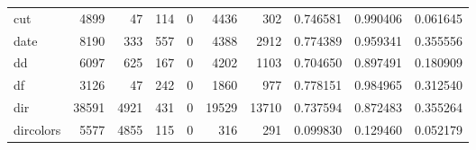 \begin{tabular}{lrrrrrrrrr}
cut       &                                               4899 &                                                 47 &                                                114 &                                                  0 &                                               4436 &                                                302 &                                           0.746581 &                               0.990406 &                             0.061645 \\
date      &                                               8190 &                                                333 &                                                557 &                                                  0 &                                               4388 &                                               2912 &                                           0.774389 &                               0.959341 &                             0.355556 \\
dd        &                                               6097 &                                                625 &                                                167 &                                                  0 &                                               4202 &                                               1103 &                                           0.704650 &                               0.897491 &                             0.180909 \\
df        &                                               3126 &                                                 47 &                                                242 &                                                  0 &                                               1860 &                                                977 &                                           0.778151 &                               0.984965 &                             0.312540 \\
dir       &                                              38591 &                                               4921 &                                                431 &                                                  0 &                                              19529 &                                              13710 &                                           0.737594 &                               0.872483 &                             0.355264 \\
dircolors &                                               5577 &                                               4855 &                                                115 &                                                  0 &                                                316 &                                                291 &                                           0.099830 &                               0.129460 &                             0.052179 \\

\end{tabular}
